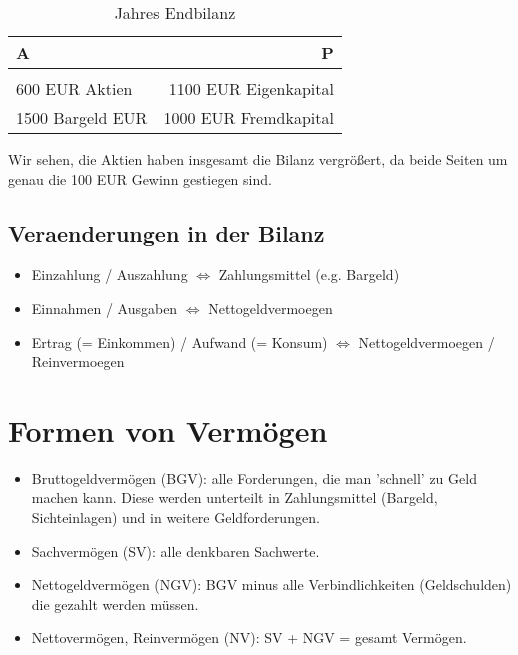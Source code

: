 \documentclass[a4paper]{article}
\begin{document}
\begin{table}
	\centering
	\caption{Jahres Endbilanz}
	\label{tab:label}
	\begin{tabular}{l|r}
		A                & P                     \\
		\hline                                   \\
		600 EUR Aktien   & 1100 EUR Eigenkapital \\
		1500 Bargeld EUR & 1000 EUR Fremdkapital \\
	\end{tabular}
\end{table}

Wir sehen, die Aktien haben insgesamt die Bilanz vergrößert, da beide Seiten
um genau die 100 EUR Gewinn gestiegen sind.

\subsection{
	Veraenderungen in der Bilanz
}

\begin{itemize}
	\item Einzahlung / Auszahlung $\Leftrightarrow$ Zahlungsmittel (e.g. Bargeld)
	\item Einnahmen / Ausgaben $\Leftrightarrow$ Nettogeldvermoegen
	\item Ertrag (= Einkommen) / Aufwand (= Konsum) $\Leftrightarrow$
	      Nettogeldvermoegen / Reinvermoegen
\end{itemize}

\section{Formen von Vermögen}

\begin{itemize}
	\item Bruttogeldvermögen (BGV): alle Forderungen, die man 'schnell' zu Geld machen
	      kann. Diese werden unterteilt in Zahlungsmittel
	      (Bargeld, Sichteinlagen) und in weitere Geldforderungen.

	\item Sachvermögen (SV): alle denkbaren Sachwerte.

	\item Nettogeldvermögen (NGV): BGV minus alle Verbindlichkeiten (Geldschulden)
	      die gezahlt werden müssen.

	\item Nettovermögen, Reinvermögen (NV): SV + NGV = gesamt Vermögen.
\end{itemize}
\end{document}
